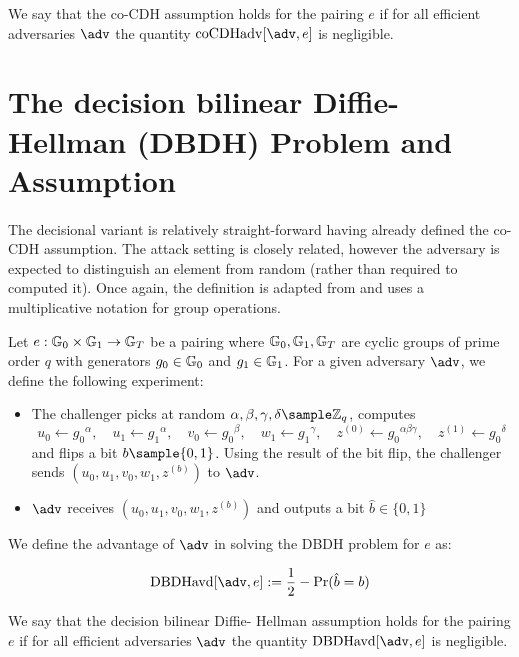 	\begin{definition}
		We say that the co-CDH assumption holds for the pairing $e$ if for all efficient adversaries $\adv$ the quantity $\mathrm{coCDHadv}[\adv, e]$ is negligible.
	\end{definition}
	
\section{The decision bilinear Diffie-Hellman (DBDH) Problem and Assumption}

\paragraph{} The decisional variant is relatively straight-forward having already defined the co-CDH assumption. The attack setting is closely related, however the adversary is expected to distinguish an element from random (rather than required to computed it). Once again, the definition is adapted from \cite{BonehShoup} and uses a multiplicative notation for group operations.

\begin{secgame}
	Let $e : \mathbb{G}_0 \times \mathbb{G}_1 \rightarrow \mathbb{G}_T$ be a pairing where $\mathbb{G}_0,\mathbb{G}_1,\mathbb{G}_T$ are cyclic groups of prime order $q$ with generators $g_0 \in \mathbb{G}_0$ and $g_1 \in \mathbb{G}_1$. For a given adversary $\adv$, we define the following experiment:
	
	\begin{itemize}
		\item The challenger picks at random $ \alpha, \beta, \gamma, \delta \sample \mathbb{Z}_q $,
			computes $$ u_0 \leftarrow {g_0}^\alpha, \quad u_1 \leftarrow {g_1}^\alpha, \quad v_0 \leftarrow {g_0}^\beta, \quad w_1 \leftarrow {g_1}^\gamma, \quad z^{(0)} \leftarrow {g_0}^{\alpha\beta\gamma}, \quad z^{(1)} \leftarrow {g_0}^\delta $$
			and flips a bit $b\sample\{0,1\}$. Using the result of the bit flip, the challenger sends $(u_0, u_1, v_0, w_1, z^{(b)})$ to $\adv$.
		\item $\adv$ receives $(u_0, u_1, v_0, w_1, z^{(b)})$ and outputs a bit $\hat b \in \{0,1\}$
	\end{itemize}
\end{secgame}

\noindent We define the advantage of $\adv$ in solving the DBDH problem for $e$ as:

\begin{equation}
	\mathrm{DBDHavd}[\adv, e] := \frac{1}{2} - \mathrm{Pr}(\hat b = b)
\end{equation}

\begin{definition}
	We say that the decision bilinear Diffie- Hellman assumption holds for the pairing $e$ if for all efficient adversaries $\adv$ the quantity $\mathrm{DBDHavd}[\adv, e]$ is negligible.
\end{definition}





















